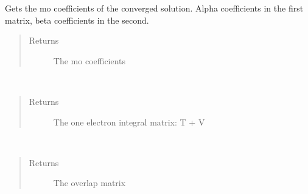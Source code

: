 \documentclass[letterpaper,10pt,english]{sphinxmanual}
\begin{document}
\begin{fulllineitems}
\begin{fulllineitems}
\end{fulllineitems}


\begin{fulllineitems}
\label{\detokenize{UHF:ghf.UHF.UHF.get_mo_coeff}}
Gets the mo coefficients of the converged solution.
Alpha coefficients in the first matrix, beta coefficients in the second.
\begin{quote}\begin{description}
\item[{Returns}] \leavevmode
The mo coefficients

\end{description}\end{quote}

\end{fulllineitems}


\begin{fulllineitems}
\label{\detokenize{UHF:ghf.UHF.UHF.get_one_e}}~\begin{quote}\begin{description}
\item[{Returns}] \leavevmode
The one electron integral matrix: T + V

\end{description}\end{quote}

\end{fulllineitems}


\begin{fulllineitems}
\label{\detokenize{UHF:ghf.UHF.UHF.get_ovlp}}~\begin{quote}\begin{description}
\item[{Returns}] \leavevmode
The overlap matrix

\end{description}\end{quote}


\end{fulllineitems}
\end{fulllineitems}
\end{document}
